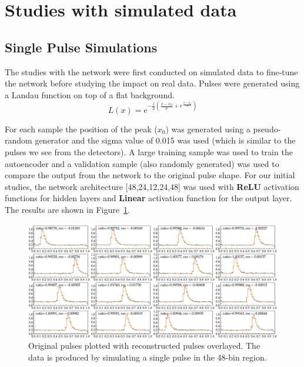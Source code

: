 \section{Studies with simulated data}

\subsection{Single Pulse Simulations}

The studies with the network were first conducted on simulated data to fine-tune the network before studying the impact on real data.
Pulses were generated using a Landau function on top of a flat background. 
\begin{equation}
L(x)=e^{-\frac{1}{2}(\frac{x-x_0}{\sigma} + e^{\frac{x-x_0}{\sigma}}) }
\end{equation}

For each sample the position of the peak ($x_0$) was generated using a pseudo-random generator and the sigma value of 0.015 was used (which is similar to the pulses we see from the detectors).
A large training sample was used to train the autoencoder and a validation sample (also randomly generated) was used to compare the output from the network to the original pulse shape. For our initial studies, the network architecture [48,24,12,24,48] was used with {\bf ReLU} activation functions for hidden layers and {\bf Linear} activation function for the output layer.
The results are shown in Figure~\ref{fig:results_sp_48}. 

\begin{figure}[h!]
\centering
\includegraphics[width=0.9\columnwidth]{results_sp_48.pdf}
\caption{Original pulses plotted with reconstructed pulses overlayed. The data is produced by simulating a single pulse in the 48-bin region.} 
\label{fig:results_sp_48}
\end{figure}

